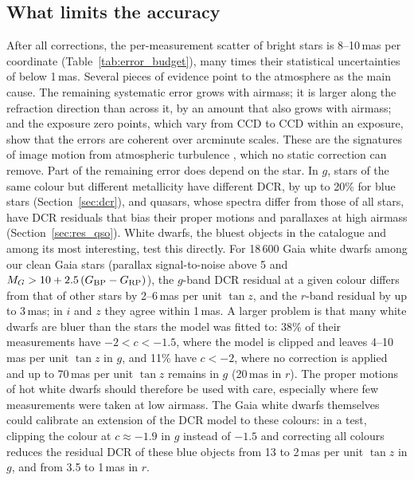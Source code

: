 \documentclass[usenatbib]{mnras}   %
\begin{document}
\subsection{What limits the accuracy}

After all corrections, the per-measurement scatter of bright stars is 8--10\,mas per coordinate (Table~\ref{tab:error_budget}), many times their statistical uncertainties of below 1\,mas. Several pieces of evidence point to the atmosphere as the main cause. The remaining systematic error grows with airmass; it is larger along the refraction direction than across it, by an amount that also grows with airmass; and the exposure zero points, which vary from CCD to CCD within an exposure, show that the errors are coherent over arcminute scales. These are the signatures of image motion from atmospheric turbulence \citep{Bernstein_2017}, which no static correction can remove. Part of the remaining error does depend on the star. In $g$, stars of the same colour but different metallicity have different DCR, by up to 20\% for blue stars (Section~\ref{sec:dcr}), and quasars, whose spectra differ from those of all stars, have DCR residuals that bias their proper motions and parallaxes at high airmass (Section~\ref{sec:res_qso}). White dwarfs, the bluest objects in the catalogue and among its most interesting, test this directly. For 18\,600 Gaia white dwarfs among our clean Gaia stars (parallax signal-to-noise above 5 and $M_G > 10 + 2.5\,(G_{\rm BP} - G_{\rm RP})$), the $g$-band DCR residual at a given colour differs from that of other stars by 2--6\,mas per unit $\tan z$, and the $r$-band residual by up to 3\,mas; in $i$ and $z$ they agree within 1\,mas. A larger problem is that many white dwarfs are bluer than the stars the model was fitted to: 38\% of their measurements have $-2 < c < -1.5$, where the model is clipped and leaves 4--10\,mas per unit $\tan z$ in $g$, and 11\% have $c < -2$, where no correction is applied and up to 70\,mas per unit $\tan z$ remains in $g$ (20\,mas in $r$). The proper motions of hot white dwarfs should therefore be used with care, especially where few measurements were taken at low airmass. The Gaia white dwarfs themselves could calibrate an extension of the DCR model to these colours: in a test, clipping the colour at $c \approx -1.9$ in $g$ instead of $-1.5$ and correcting all colours reduces the residual DCR of these blue objects from 13 to 2\,mas per unit $\tan z$ in $g$, and from 3.5 to 1\,mas in $r$.
\end{document}
